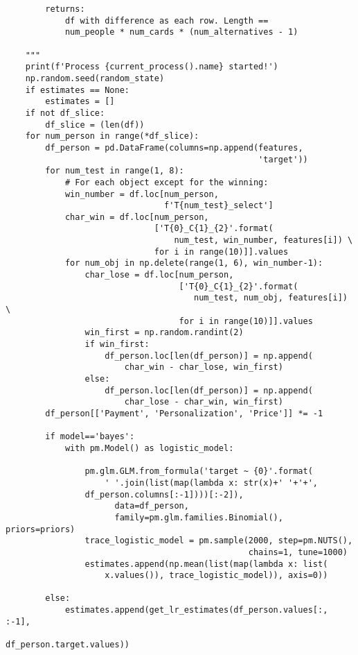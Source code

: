 \documentclass[a4paper, 12pt]{extreport}
\begin{document}
\begin{verbatim}
        returns:
            df with difference as each row. Length ==
            num_people * num_cards * (num_alternatives - 1)

    """
    print(f'Process {current_process().name} started!')
    np.random.seed(random_state)
    if estimates == None:
        estimates = []
    if not df_slice:
        df_slice = (len(df))
    for num_person in range(*df_slice):
        df_person = pd.DataFrame(columns=np.append(features,
                                                   'target'))
        for num_test in range(1, 8):
            # For each object except for the winning:
            win_number = df.loc[num_person,
                                f'T{num_test}_select']
            char_win = df.loc[num_person,
                              ['T{0}_C{1}_{2}'.format(
                                  num_test, win_number, features[i]) \
                              for i in range(10)]].values
            for num_obj in np.delete(range(1, 6), win_number-1):
                char_lose = df.loc[num_person,
                                   ['T{0}_C{1}_{2}'.format(
                                      num_test, num_obj, features[i]) \
                                   for i in range(10)]].values
                win_first = np.random.randint(2)
                if win_first:
                    df_person.loc[len(df_person)] = np.append(
                        char_win - char_lose, win_first)
                else:
                    df_person.loc[len(df_person)] = np.append(
                        char_lose - char_win, win_first)
        df_person[['Payment', 'Personalization', 'Price']] *= -1

        if model=='bayes':
            with pm.Model() as logistic_model:

                pm.glm.GLM.from_formula('target ~ {0}'.format(
                    ' '.join(list(map(lambda x: str(x)+' '+'+',
                df_person.columns[:-1])))[:-2]),
                      data=df_person,
                      family=pm.glm.families.Binomial(), priors=priors)
                trace_logistic_model = pm.sample(2000, step=pm.NUTS(),
                                                 chains=1, tune=1000)
                estimates.append(np.mean(list(map(lambda x: list(
                    x.values()), trace_logistic_model)), axis=0))

        else:
            estimates.append(get_lr_estimates(df_person.values[:, :-1],
                                              df_person.target.values))


\end{verbatim}
\end{document}

